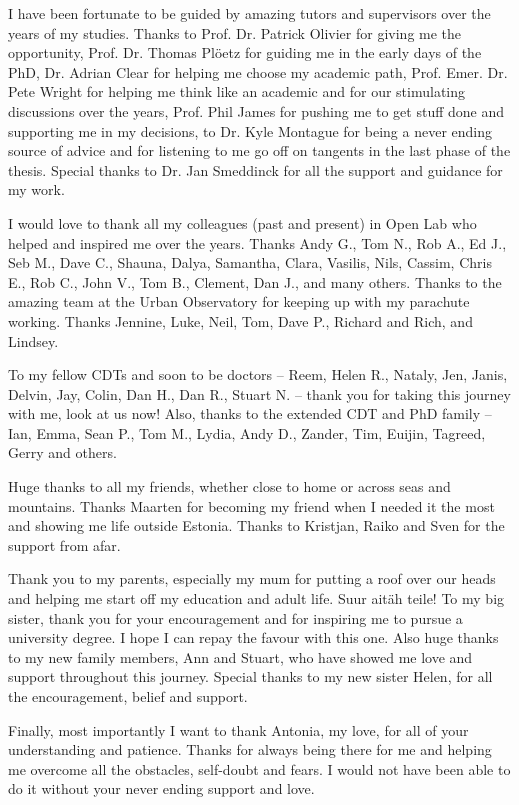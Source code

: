 
\begin{acknowledgements}      

I have been fortunate to be guided by amazing tutors and supervisors over the years of my studies. Thanks to Prof. Dr. Patrick Olivier for giving me the opportunity, Prof. Dr. Thomas Plöetz for guiding me in the early days of the PhD, Dr. Adrian Clear for helping me choose my academic path, Prof. Emer. Dr. Pete Wright for helping me think like an academic and for our stimulating discussions over the years, Prof. Phil James for pushing me to get stuff done and supporting me in my decisions, to Dr. Kyle Montague for being a never ending source of advice and for listening to me go off on tangents in the last phase of the thesis. Special thanks to Dr. Jan Smeddinck for all the support and guidance for my work.

I would love to thank all my colleagues (past and present) in Open Lab who helped and inspired me over the years. Thanks Andy G., Tom N., Rob A., Ed J., Seb M., Dave C., Shauna, Dalya, Samantha, Clara, Vasilis, Nils, Cassim, Chris E., Rob C., John V., Tom B., Clement, Dan J., and many others. Thanks to the amazing team at the Urban Observatory for keeping up with my parachute working. Thanks Jennine, Luke, Neil, Tom, Dave P., Richard and Rich, and Lindsey.

To my fellow CDTs and soon to be doctors -- Reem, Helen R., Nataly, Jen, Janis, Delvin, Jay, Colin, Dan H., Dan R., Stuart N. -- thank you for taking this journey with me, look at us now! Also, thanks to the extended CDT and PhD family -- Ian, Emma, Sean P., Tom M., Lydia, Andy D., Zander, Tim, Euijin, Tagreed, Gerry and others.

Huge thanks to all my friends, whether close to home or across seas and mountains. Thanks Maarten for becoming my friend when I needed it the most and showing me life outside Estonia. Thanks to Kristjan, Raiko and Sven for the support from afar.

Thank you to my parents, especially my mum for putting a roof over our heads and helping me start off my education and adult life. Suur aitäh teile! To my big sister, thank you for your encouragement and for inspiring me to pursue a university degree. I hope I can repay the favour with this one. Also huge thanks to my new family members, Ann and Stuart, who have showed me love and support throughout this journey. Special thanks to my new sister Helen, for all the encouragement, belief and support.

Finally, most importantly I want to thank Antonia, my love, for all of your understanding and patience. Thanks for always being there for me and helping me overcome all the obstacles, self-doubt and fears. I would not have been able to do it without your never ending support and love.

\end{acknowledgements}
